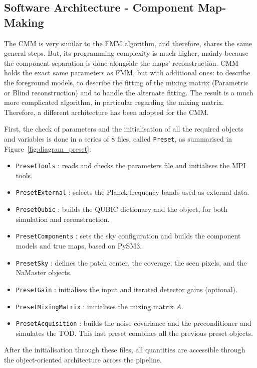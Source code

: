 \documentclass[../../thesis.tex]{subfiles}
\begin{document}
\subsection{Software Architecture - Component Map-Making}

The CMM is very similar to the FMM algorithm, and therefore, shares the same general steps. But, its programming complexity is much higher, mainly because the component separation is done alongside the maps' reconstruction. CMM holds the exact same parameters as FMM, but with additional ones: to describe the foreground models, to describe the fitting of the mixing matrix (Parametric or Blind reconstruction) and to handle the alternate fitting.
The result is a much more complicated algorithm, in particular regarding the mixing matrix. Therefore, a different architecture has been adopted for the CMM.

First, the check of parameters and the initialisation of all the required objects and variables is done in a series of $8$ files, called \texttt{Preset}, as summarised in Figure~\ref{fig:diagram_preset}:

\begin{itemize}
  \item \texttt{PresetTools} : reads and checks the parameters file and initialises the MPI tools.
  \item \texttt{PresetExternal} : selects the Planck frequency bands used as external data.
  \item \texttt{PresetQubic} : builds the QUBIC dictionary and the \texttt{} object, for both simulation and reconstruction.
  \item \texttt{PresetComponents} : sets the sky configuration and builds the component models and true maps, based on PySM3.
  \item \texttt{PresetSky} : defines the patch center, the coverage, the seen pixels, and the NaMaster objects.
  \item \texttt{PresetGain} : initialises the input and iterated detector gains (optional).
  \item \texttt{PresetMixingMatrix} : initialises the mixing matrix $A$.
  \item \texttt{PresetAcquisition} : builds the noise covariance and the preconditioner and simulates the TOD. This last preset combines all the previous preset objects.
\end{itemize}

After the initialisation through these files, all quantities are accessible through the object-oriented architecture across the pipeline.
\end{document}
